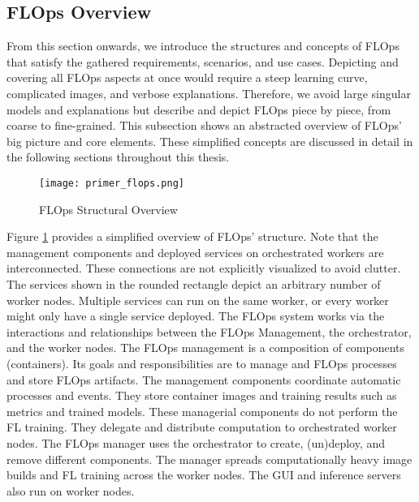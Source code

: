 \subsection{FLOps Overview}

From this section onwards, we introduce the structures and concepts of FLOps that satisfy the gathered requirements, scenarios, and use cases.
Depicting and covering all FLOps aspects at once would require a steep learning curve, complicated images, and verbose explanations.
Therefore, we avoid large singular models and explanations but describe and depict FLOps piece by piece, from coarse to fine-grained.
This subsection shows an abstracted overview of FLOps' big picture and core elements.
These simplified concepts are discussed in detail in the following sections throughout this thesis.

\begin{figure}[h]
    \begin{adjustwidth}{-0.1\paperwidth}{-0.1\paperwidth}
        \centering
        \texttt{[image: primer\_flops.png]}
        \caption{FLOps Structural Overview}
        \label{fig:flops_structure_overview}
    \end{adjustwidth}
\end{figure}

Figure \ref{fig:flops_structure_overview} provides a simplified overview of FLOps' structure.
Note that the management components and deployed services on orchestrated workers are interconnected.
These connections are not explicitly visualized to avoid clutter.
The services shown in the rounded rectangle depict an arbitrary number of worker nodes.
Multiple services can run on the same worker, or every worker might only have a single service deployed.
The FLOps system works via the interactions and relationships between the FLOps Management, the orchestrator, and the worker nodes.
The FLOps management is a composition of components (containers).
Its goals and responsibilities are to manage and FLOps processes and store FLOps artifacts.
The management components coordinate automatic processes and events.
They store container images and training results such as metrics and trained models.
These managerial components do not perform the FL training.
They delegate and distribute computation to orchestrated worker nodes.
The FLOps manager uses the orchestrator to create, (un)deploy, and remove different components.
The manager spreads computationally heavy image builds and FL training across the worker nodes.
The GUI and inference servers also run on worker nodes.

